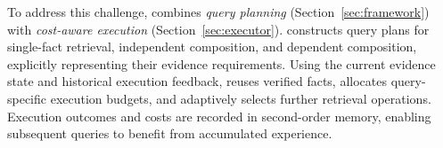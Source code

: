 To address this challenge, \sys combines \emph{query planning}
(Section~\ref{sec:framework}) with \emph{cost-aware execution}
(Section~\ref{sec:executor}).
\sys constructs query plans for single-fact retrieval, independent composition, and dependent composition, explicitly representing their evidence requirements.
Using the current evidence state and historical execution feedback, \sys reuses verified facts, allocates query-specific execution budgets, and adaptively selects further retrieval
operations. Execution outcomes and costs are recorded in second-order memory, enabling subsequent queries to benefit from accumulated experience.



